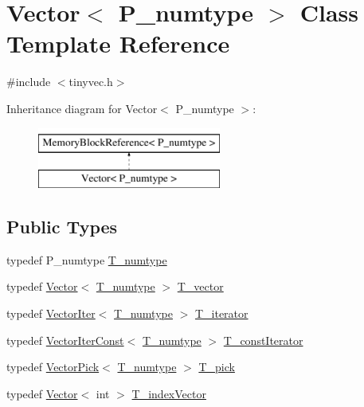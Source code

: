 \hypertarget{classVector}{}\section{Vector$<$ P\+\_\+numtype $>$ Class Template Reference}
\label{classVector}


{\ttfamily \#include $<$tinyvec.\+h$>$}

Inheritance diagram for Vector$<$ P\+\_\+numtype $>$\+:\begin{figure}[H]
\begin{center}
\leavevmode
\includegraphics[height=2.000000cm]{classVector}
\end{center}
\end{figure}
\subsection*{Public Types}
\begin{DoxyCompactItemize}
\item 
typedef P\+\_\+numtype \hyperlink{classVector_a63dfe9fb06d8b4595b9e8fb10fc0755e}{T\+\_\+numtype}
\item 
typedef \hyperlink{classVector}{Vector}$<$ \hyperlink{classVector_a63dfe9fb06d8b4595b9e8fb10fc0755e}{T\+\_\+numtype} $>$ \hyperlink{classVector_a29e279edfeac4d65aad0d814c05cfaf0}{T\+\_\+vector}
\item 
typedef \hyperlink{classVectorIter}{Vector\+Iter}$<$ \hyperlink{classVector_a63dfe9fb06d8b4595b9e8fb10fc0755e}{T\+\_\+numtype} $>$ \hyperlink{classVector_a3595565cd5a82f30d054fe37d0aaa802}{T\+\_\+iterator}
\item 
typedef \hyperlink{classVectorIterConst}{Vector\+Iter\+Const}$<$ \hyperlink{classVector_a63dfe9fb06d8b4595b9e8fb10fc0755e}{T\+\_\+numtype} $>$ \hyperlink{classVector_a6713f9dd10d7bd7d91b7452cf0208565}{T\+\_\+const\+Iterator}
\item 
typedef \hyperlink{classVectorPick}{Vector\+Pick}$<$ \hyperlink{classVector_a63dfe9fb06d8b4595b9e8fb10fc0755e}{T\+\_\+numtype} $>$ \hyperlink{classVector_a5fbb048b36ae3897d8b0c6d993b33a9d}{T\+\_\+pick}
\item 
typedef \hyperlink{classVector}{Vector}$<$ int $>$ \hyperlink{classVector_aa02a1323b0f3ca8c6cc82732fad69768}{T\+\_\+index\+Vector}
\end{DoxyCompactItemize}
